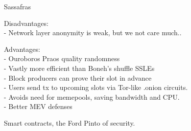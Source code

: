 \documentclass{beamer}
\begin{document}
\begin{frame}{Sassafras}

Disadvantages: \\
- Network layer anonymity is weak, but we not care much.. \\

\bigskip\bigskip

Advantages: \\ \smallskip
- Ouroboros Praos quality randomness \\ \smallskip
- Vastly more efficient than Boneh's shuffle SSLEs \\ \smallskip
- Block producers can prove their slot in advance \\ \smallskip
- Users send tx to upcoming slots via Tor-like {.onion} circuits. \\ \smallskip
- Avoids need for memepools, saving bandwidth and CPU. \\ \smallskip
- Better MEV defenses \\ \smallskip

\pause\bigskip\bigskip

\hspace{10pt} Smart contracts, the Ford Pinto of security.

\end{frame}
\end{document}
